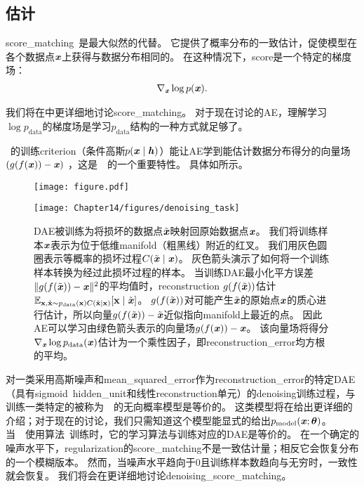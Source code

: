 
\subsection{估计}
\label{sec:estimating_the_score}
\gls{score_matching}~\citep{Hyvarinen-2005}是最大似然的代替。
它提供了概率分布的一致估计，促使模型在各个数据点$\boldsymbol{\mathit{x}}$上获得与数据分布相同的。
在这种情况下，\gls{score}是一个特定的梯度场：
\begin{align}
 \nabla_{\boldsymbol{\mathit{x}}} \log p(\boldsymbol{\mathit{x}}) .
\end{align}

我们将在中更详细地讨论\gls{score_matching}。
对于现在讨论的\gls{AE}，理解学习$\log p_{\text{data}}$的梯度场是学习$p_{\text{data}}$结构的一种方式就足够了。


~的训练\gls{criterion}（条件高斯$p(\boldsymbol{\mathit{x}} \mid \boldsymbol{\mathit{h}})$）能让\gls{AE}学到能估计数据分布得分的向量场$(g(f(\boldsymbol{\mathit{x}}))-\boldsymbol{\mathit{x}})$ ，这是~~的一个重要特性。
具体如所示。

\begin{figure}[!htb]
\ifOpenSource
\centerline{\texttt{[image: figure.pdf]}}
\else
\centerline{\texttt{[image: Chapter14/figures/denoising\_task]}}
\fi
\caption{\gls{DAE}被训练为将损坏的数据点$\tilde {\boldsymbol{\mathit{x}}}$映射回原始数据点$\boldsymbol{\mathit{x}}$。
我们将训练样本$\boldsymbol{\mathit{x}}$表示为位于低维\gls{manifold}（粗黑线）附近的红叉。
我们用灰色圆圈表示等概率的损坏过程$C(\tilde {\boldsymbol{\mathit{x}}} \mid \boldsymbol{\mathit{x}})$。
灰色箭头演示了如何将一个训练样本转换为经过此损坏过程的样本。
当训练\gls{DAE}最小化平方误差$\| g(f(\tilde {\boldsymbol{\mathit{x}}})) - \boldsymbol{\mathit{x}} \|^2$的平均值时，\gls{reconstruction} $g(f(\tilde {\boldsymbol{\mathit{x}}}))$估计$\mathbb{E}_{\mathbf{x}, \tilde{\mathbf{x}} \sim p_{\text{data}}(\mathbf{x}) C(\tilde{\mathbf{x}} \mid \mathbf{x})}[\mathbf{x} \mid \tilde{\boldsymbol{\mathit{x}}}]$。
$g(f(\tilde {\boldsymbol{\mathit{x}}}))$对可能产生$\tilde {\boldsymbol{\mathit{x}}}$的原始点$\boldsymbol{\mathit{x}}$的质心进行估计，所以向量$ g(f(\tilde {\boldsymbol{\mathit{x}}})) - \tilde {\boldsymbol{\mathit{x}}} $近似指向\gls{manifold}上最近的点。
因此\gls{AE}可以学习由绿色箭头表示的向量场$ g(f( \boldsymbol{\mathit{x}})) -  \boldsymbol{\mathit{x}} $。
该向量场将得分$\nabla_{\boldsymbol{\mathit{x}}} \log p_{\text{data}}(\boldsymbol{\mathit{x}})$估计为一个乘性因子，即\gls{reconstruction_error}均方根的平均。
}
\label{fig:chap14_denoising_task}
\end{figure}

对一类采用高斯噪声和\gls{mean_squared_error}作为\gls{reconstruction_error}的特定\gls{DAE}（具有sigmoid~\gls{hidden_unit}和线性\gls{reconstruction}单元）的\gls{denoising}训练过程，与训练一类特定的被称为~~的无向概率模型是等价的\citep{Vincent-NC-2011-small}。
这类模型将在给出更详细的介绍；对于现在的讨论，我们只需知道这个模型能显式的给出$p_{\text{model}}(\boldsymbol{\mathit{x}}; \boldsymbol{\theta})$。
当~~使用算法~\citep{Kingma+LeCun-2010-small}训练时，它的学习算法与训练对应的\gls{DAE}是等价的。
在一个确定的噪声水平下，\gls{regularization}的\gls{score_matching}不是一致估计量；相反它会恢复分布的一个模糊版本。
然而，当噪声水平趋向于0且训练样本数趋向与无穷时，一致性就会恢复。
我们将会在更详细地讨论\gls{denoising_score_matching}。


